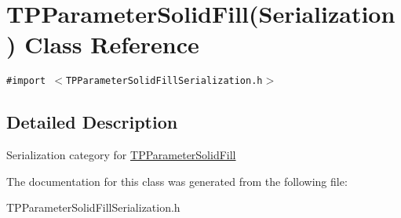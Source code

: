 \hypertarget{interface_t_p_parameter_solid_fill_07_serialization_08}{
\section{TPParameterSolidFill(Serialization) Class Reference}
\label{interface_t_p_parameter_solid_fill_07_serialization_08}
}
{\tt \#import $<$TPParameterSolidFillSerialization.h$>$}



\subsection{Detailed Description}
Serialization category for \hyperlink{interface_t_p_parameter_solid_fill}{TPParameterSolidFill} 

The documentation for this class was generated from the following file:\begin{CompactItemize}
\item 
TPParameterSolidFillSerialization.h\end{CompactItemize}
